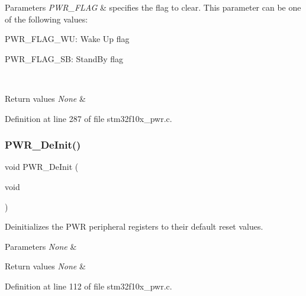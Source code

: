 \begin{DoxyParams}{Parameters}
{\em P\+W\+R\+\_\+\+F\+L\+AG} & specifies the flag to clear. This parameter can be one of the following values\+: \begin{DoxyItemize}
\item P\+W\+R\+\_\+\+F\+L\+A\+G\+\_\+\+WU\+: Wake Up flag \item P\+W\+R\+\_\+\+F\+L\+A\+G\+\_\+\+SB\+: Stand\+By flag \end{DoxyItemize}
\\
\hline
\end{DoxyParams}

\begin{DoxyRetVals}{Return values}
{\em None} & \\
\hline
\end{DoxyRetVals}


Definition at line 287 of file stm32f10x\+\_\+pwr.\+c.

\mbox{\label{group___p_w_r___private___functions_gad03a0aac7bc3bc3a9fd012f3769a6990}} 
\subsubsection{\texorpdfstring{P\+W\+R\+\_\+\+De\+Init()}{PWR\_DeInit()}}
{\footnotesize\ttfamily void P\+W\+R\+\_\+\+De\+Init (\begin{DoxyParamCaption}\item[{void}]{ }\end{DoxyParamCaption})}



Deinitializes the P\+WR peripheral registers to their default reset values. 


\begin{DoxyParams}{Parameters}
{\em None} & \\
\hline
\end{DoxyParams}

\begin{DoxyRetVals}{Return values}
{\em None} & \\
\hline
\end{DoxyRetVals}


Definition at line 112 of file stm32f10x\+\_\+pwr.\+c.

